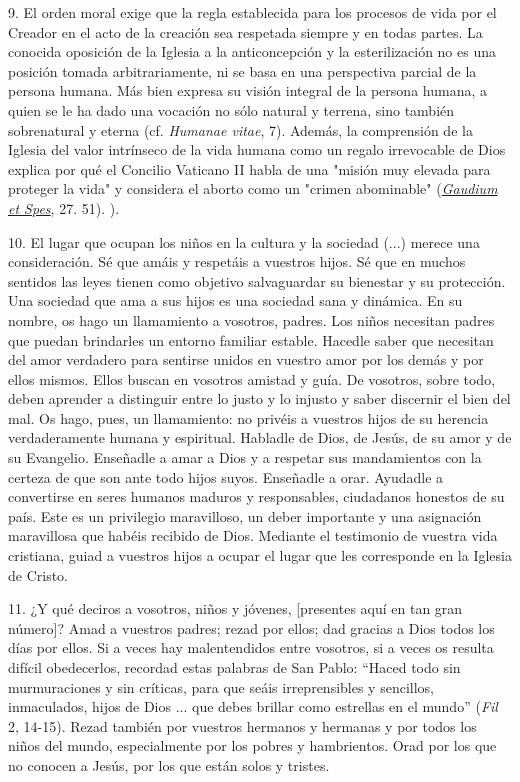 \begin{body}
\begin{body}
9. El orden moral exige que la regla establecida para los procesos de vida por el Creador en el acto de la creación sea respetada siempre y en todas partes. La conocida oposición de la Iglesia a la anticoncepción y la esterilización no es una posición tomada arbitrariamente, ni se basa en una perspectiva parcial de la persona humana. Más bien expresa su visión integral de la persona humana, a quien se le ha dado una vocación no sólo natural y terrena, sino también sobrenatural y eterna (cf. \emph{Humanae vitae}, 7). Además, la comprensión de la Iglesia del valor intrínseco de la vida humana como un regalo irrevocable de Dios explica por qué el Concilio Vaticano II habla de una "misión muy elevada para proteger la vida" y considera el aborto como un "crimen abominable" (\href{http://www.vatican.va/archive/hist_councils/ii_vatican_council/documents/vat-ii_const_19651207_gaudium-et-spes_it.html}{\emph{\emph{Gaudium et Spes}}}, 27. 51). ).

10. El lugar que ocupan los niños en la cultura y la sociedad (...) merece una consideración. Sé que amáis y respetáis a vuestros hijos. Sé que en muchos sentidos las leyes tienen como objetivo salvaguardar su bienestar y su protección. Una sociedad que ama a sus hijos es una sociedad sana y dinámica. En su nombre, os hago un llamamiento a vosotros, padres. Los niños necesitan padres que puedan brindarles un entorno familiar estable. Hacedle saber que necesitan del amor verdadero para sentirse unidos en vuestro amor por los demás y por ellos mismos. Ellos buscan en vosotros amistad y guía. De vosotros, sobre todo, deben aprender a distinguir entre lo justo y lo injusto y saber discernir el bien del mal. Os hago, pues, un llamamiento: no privéis a vuestros hijos de su herencia verdaderamente humana y espiritual. Habladle de Dios, de Jesús, de su amor y de su Evangelio. Enseñadle a amar a Dios y a respetar sus mandamientos con la certeza de que son ante todo hijos suyos. Enseñadle a orar. Ayudadle a convertirse en seres humanos maduros y responsables, ciudadanos honestos de su país. Este es un privilegio maravilloso, un deber importante y una asignación maravillosa que habéis recibido de Dios. Mediante el testimonio de vuestra vida cristiana, guiad a vuestros hijos a ocupar el lugar que les corresponde en la Iglesia de Cristo.

11. ¿Y qué deciros a vosotros, niños y jóvenes, {[}presentes aquí en tan gran número{]}? Amad a vuestros padres; rezad por ellos; dad gracias a Dios todos los días por ellos. Si a veces hay malentendidos entre vosotros, si a veces os resulta difícil obedecerlos, recordad estas palabras de San Pablo: ``Haced todo sin murmuraciones y sin críticas, para que seáis irreprensibles y sencillos, inmaculados, hijos de Dios ... que debes brillar como estrellas en el mundo'' (\emph{Fil} 2, 14-15). Rezad también por vuestros hermanos y hermanas y por todos los niños del mundo, especialmente por los pobres y hambrientos. Orad por los que no conocen a Jesús, por los que están solos y tristes.


\end{body}
\end{body}
